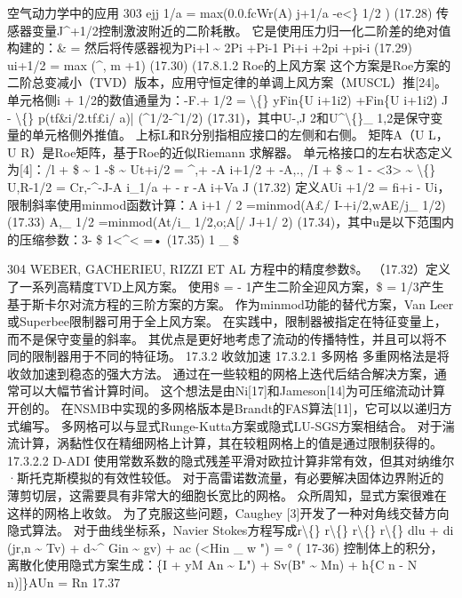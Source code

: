 \documentclass[UTF8,11pt,a4paper,openany,fontset=fandol]{ctexbook}
\begin{document}
空气动力学中的应用 303 ejj 1/a = max(0.0.fcWr(A) j+1/a -e<\} 1/2 ) (17.28) 传感器变量J\textasciicircum{}+1/2控制激波附近的二阶耗散。 它是使用压力归一化二阶差的绝对值构建的：\& = 然后将传感器视为Pi+l \textasciitilde{} 2Pi +Pi-1 Pi+i +2pi +pi-i (17.29) ui+1/2 = max (\textasciicircum{}, m +1) (17.30) (17.8.1.2 Roe的上风方案 这个方案是Roe方案的二阶总变减小（TVD）版本，应用守恒定律的单调上风方案（MUSCL）推[24]。 单元格侧i + 1/2的数值通量为：-F.+ 1/2 = \textbackslash\{\} yFin\{U i+1i2) +Fin\{U i+1i2) J - \textbackslash\{\} p(tf\&i/2.tf£i/ a)| (\textasciicircum{}1/2-\textasciicircum{}1/2) (17.31)，其中U-,J 2和U\textasciicircum{}\textbackslash\{\}\_ 1,2是保守变量的单元格侧外推值。 上标L和R分别指相应接口的左侧和右侧。 矩阵A（U L，U R）是Roe矩阵，基于Roe的近似Riemann 求解器。 单元格接口的左右状态定义为[4]：/l + \$ \textasciitilde{} 1 -\$ \textasciitilde{} Ut+i/2 = \textasciicircum{},+ -A i+1/2 + -A,., /I + \$ \textasciitilde{} 1 - <3> \textasciitilde{} \textbackslash\{\} U,R-1/2 = Cr,-\textasciicircum{}-J-A i\_1/a + - r -A i+Va J (17.32) 定义AUi +1/2 = fi+i - Ui，限制斜率使用minmod函数计算：A i+1 / 2 =minmod(A£/ I-+i/2,wAE/j\_ 1/2) (17.33) A,\_ 1/2 =minmod(At/i\_ 1/2,o;A[/ J+1/ 2) (17.34)，其中u是以下范围内的压缩参数：3- \$ 1<\textasciicircum{}< =• (17.35) 1 \_ \$

304 WEBER, GACHERIEU, RIZZI ET AL 方程中的精度参数\$。 （17.32）定义了一系列高精度TVD上风方案。 使用\$ = - 1产生二阶全迎风方案，\$ = 1/3产生基于斯卡尔对流方程的三阶方案的方案。 作为minmod功能的替代方案，Van Leer或Superbee限制器可用于全上风方案。 在实践中，限制器被指定在特征变量上，而不是保守变量的斜率。 其优点是更好地考虑了流动的传播特性，并且可以将不同的限制器用于不同的特征场。 17.3.2 收敛加速 17.3.2.1 多网格 多重网格法是将收敛加速到稳态的强大方法。 通过在一些较粗的网格上迭代后结合解决方案，通常可以大幅节省计算时间。 这个想法是由Ni[17]和Jameson[14]为可压缩流动计算开创的。 在NSMB中实现的多网格版本是Brandt的FAS算法[11]，它可以以递归方式编写。 多网格可以与显式Runge-Kutta方案或隐式LU-SGS方案相结合。 对于湍流计算，涡黏性仅在精细网格上计算，其在较粗网格上的值是通过限制获得的。 17.3.2.2 D-ADI 使用常数系数的隐式残差平滑对欧拉计算非常有效，但其对纳维尔·斯托克斯模拟的有效性较低。 对于高雷诺数流量，有必要解决固体边界附近的薄剪切层，这需要具有非常大的细胞长宽比的网格。 众所周知，显式方案很难在这样的网格上收敛。 为了克服这些问题，Caughey [3]开发了一种对角线交替方向隐式算法。 对于曲线坐标系，Navier Stokes方程写成r\textbackslash\{\} r\textbackslash\{\} r\textbackslash\{\} r\textbackslash\{\} dlu + di (jr,n \textasciitilde{} Tv) + d\textasciitilde{}\textasciicircum{} Gin \textasciitilde{} gv) + ac (<Hin \_ w ") = ° ( 17-36) 控制体上的积分，离散化使用隐式方案生成：\{I + yM An \textasciitilde{} L") + Sv(B" \textasciitilde{} Mn) + h\{C n - N n)]\}AUn = Rn 17.37
\end{document}
